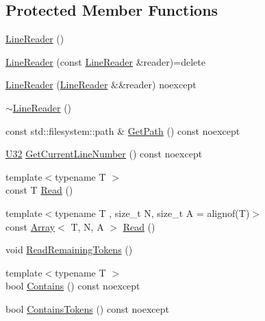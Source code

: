 \subsection*{Protected Member Functions}
\begin{DoxyCompactItemize}
\item 
\mbox{\hyperlink{classmage_1_1_line_reader_ab4a46321d7ea3ecda2d6390c78a7285b}{Line\+Reader}} ()
\item 
\mbox{\hyperlink{classmage_1_1_line_reader_ae4f871bebae110704b34c0bd88460639}{Line\+Reader}} (const \mbox{\hyperlink{classmage_1_1_line_reader}{Line\+Reader}} \&reader)=delete
\item 
\mbox{\hyperlink{classmage_1_1_line_reader_ae90c546a98e113a48ca1c94b854a4866}{Line\+Reader}} (\mbox{\hyperlink{classmage_1_1_line_reader}{Line\+Reader}} \&\&reader) noexcept
\item 
\mbox{\hyperlink{classmage_1_1_line_reader_ad9753ea392ebe5b3867852d3392fb1e7}{$\sim$\+Line\+Reader}} ()
\item 
const std\+::filesystem\+::path \& \mbox{\hyperlink{classmage_1_1_line_reader_a9740b3cecdcf5a27c696a08eef3b09da}{Get\+Path}} () const noexcept
\item 
\mbox{\hyperlink{namespacemage_aa5d6eaabaac3cdd01873d6a3d27e90f3}{U32}} \mbox{\hyperlink{classmage_1_1_line_reader_aa0ed768e2799b74f2341c56fc6ac4969}{Get\+Current\+Line\+Number}} () const noexcept
\item 
{\footnotesize template$<$typename T $>$ }\\const T \mbox{\hyperlink{classmage_1_1_line_reader_a9bbad433ab93ce012aec7155adafbedb}{Read}} ()
\item 
{\footnotesize template$<$typename T , size\+\_\+t N, size\+\_\+t A = alignof(\+T)$>$ }\\const \mbox{\hyperlink{structmage_1_1_array}{Array}}$<$ T, N, A $>$ \mbox{\hyperlink{classmage_1_1_line_reader_a208eb25a7715761178317eec72c93c75}{Read}} ()
\item 
void \mbox{\hyperlink{classmage_1_1_line_reader_aa12f309eaa7aace705ff4e0199c4fbfc}{Read\+Remaining\+Tokens}} ()
\item 
{\footnotesize template$<$typename T $>$ }\\bool \mbox{\hyperlink{classmage_1_1_line_reader_a89a31254af144fd0c9e7f684cdaa28e7}{Contains}} () const noexcept
\item 
bool \mbox{\hyperlink{classmage_1_1_line_reader_aeb88e4082cfe3ae1ff84a82fcde26298}{Contains\+Tokens}} () const noexcept
\end{DoxyCompactItemize}
